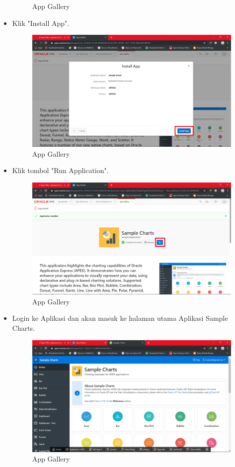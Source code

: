 \documentclass[12pt, times new roman]{article}
\begin{document}
\begin{itemize}
\begin{figure}[!htpb]
	\caption{App Gallery}
\end{figure}
\item Klik "Install App".
\begin{figure}[!htpb]
	\centering
	\includegraphics[width=12.5cm]{figures/Screenshot_29.png}
	\caption{App Gallery}
\end{figure}
\item Klik tombol "Run Application".
\begin{figure}[!htpb]
	\centering
	\includegraphics[width=12.5cm]{figures/Screenshot_30.png}
	\caption{App Gallery}
\end{figure}
\item Login ke Aplikasi dan akan masuk ke halaman utama Aplikasi Sample Charts.
\begin{figure}[!htpb]
	\centering
	\includegraphics[width=12.5cm]{figures/Screenshot_31.png}
	\caption{App Gallery}
\end{figure}
\end{itemize}
\end{document}
